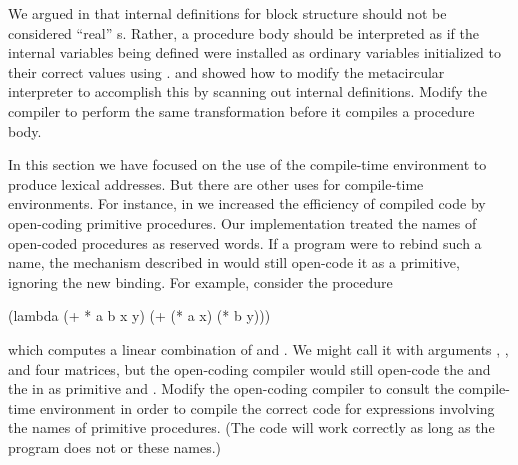 \begin{exercise}
	\label{Exercise 5.43}
	We argued in  that internal definitions for block structure should not be considered “real” s.
	Rather, a procedure body should be interpreted as if the internal variables being defined were installed as ordinary  variables initialized to their correct values using .
	 and  showed how to modify the metacircular interpreter to accomplish this by scanning out internal definitions.
	Modify the compiler to perform the same transformation before it compiles a procedure body.
\end{exercise}



\begin{exercise}
	\label{Exercise 5.44}
	In this section we have focused on the use of the compile-time environment to produce lexical addresses.
	But there are other uses for compile-time environments.
	For instance, in  we increased the efficiency of compiled code by open-coding primitive procedures.
	Our implementation treated the names of open-coded procedures as reserved words.
	If a program were to rebind such a name, the mechanism described in  would still open-code it as a primitive, ignoring the new binding.
	For example, consider the procedure
	\begin{scheme}
	  (lambda (+ * a b x y)
	    (+ (* a x) (* b y)))
	\end{scheme}
	which computes a linear combination of  and .
	We might call it with arguments , , and four matrices, but the open-coding compiler would still open-code the \code{+} and the \code{*} in  as primitive \code{+} and \code{*}.
	Modify the open-coding compiler to consult the compile-time environment in order to compile the correct code for expressions involving the names of primitive procedures.
	(The code will work correctly as long as the program does not  or  these names.)
\end{exercise}
